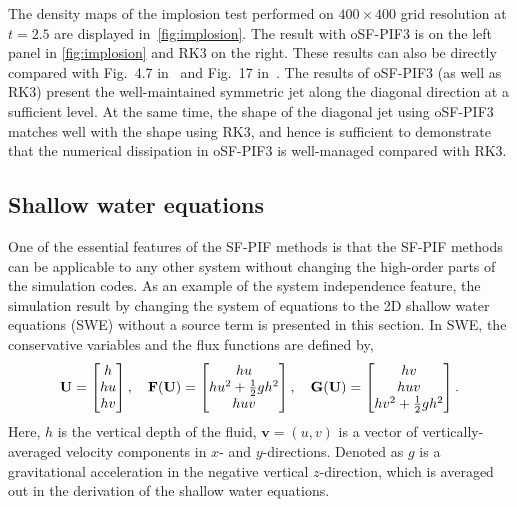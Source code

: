 The density maps of the implosion test performed on
\( 400 \times 400 \) grid resolution at \( t = 2.5 \) are displayed in~\cref{fig:implosion}.
The result with oSF-PIF3 is on the left panel in \cref{fig:implosion} and RK3 on the right.
These results can also be directly compared with
Fig.~4.7 in~\cite{liska2003comparison} and Fig.~17 in~\cite{stone2008athena}.
The results of oSF-PIF3 (as well as RK3) present
the well-maintained symmetric jet along the diagonal direction
at a sufficient level.
At the same time, the shape of the diagonal jet using oSF-PIF3 matches
well with the shape using RK3,
and hence is sufficient to demonstrate that the numerical dissipation in oSF-PIF3
is well-managed compared with RK3.


\subsection{Shallow water equations}\label{subsec:shallow}

One of the essential features of the SF-PIF methods is that the SF-PIF methods
can be applicable to any other system without changing the high-order parts of the simulation codes.
As an example of the system independence feature,
the simulation result by changing the system of equations to the 2D shallow water equations (SWE)
without a source term is presented in this section.
In SWE, the conservative variables and the flux functions are defined by,
\begin{equation}\label{eq:swe_gov}
    \mathbf{U} = \begin{bmatrix}
        h \\
        h u \\
        h v
    \end{bmatrix},\quad
    \mathbf{F} (\mathbf{U}) = \begin{bmatrix}
        h u \\
        h u^{2} + \frac{1}{2} g h^{2} \\
        h u v
    \end{bmatrix}, \quad
    \mathbf{G} (\mathbf{U}) = \begin{bmatrix}
        h v \\
        h u v \\
        h v^{2} + \frac{1}{2} g h^{2}
    \end{bmatrix}.
\end{equation}
Here, \( h \) is the vertical depth of the fluid,
\( \mathbf{v} = \left( u, v \right)  \) is a vector of 
vertically-averaged velocity components in $x$- and $y$-directions.
Denoted as \( g \) is a gravitational acceleration in the negative vertical 
$z$-direction, which is averaged out in the derivation of the shallow water equations.

